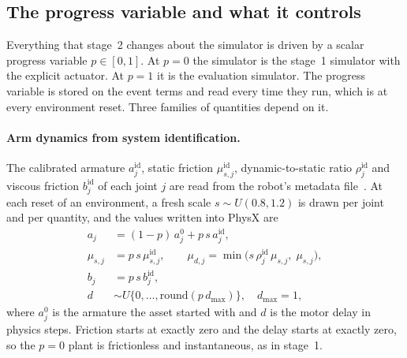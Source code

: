 \subsection{The progress variable and what it controls}

Everything that stage~2 changes about the simulator is driven by a scalar progress variable $p\in[0,1]$. At $p=0$ the simulator is the stage~1 simulator with the explicit actuator. At $p=1$ it is the evaluation simulator. The progress variable is stored on the event terms and read every time they run, which is at every environment reset. Three families of quantities depend on it.

\paragraph{Arm dynamics from system identification.} The calibrated armature $a^{\mathrm{id}}_j$, static friction $\mu^{\mathrm{id}}_{s,j}$, dynamic-to-static ratio $\rho^{\mathrm{id}}_j$ and viscous friction $b^{\mathrm{id}}_j$ of each joint $j$ are read from the robot's metadata file~\cite{bjelonic2025pace}. At each reset of an environment, a fresh scale $s\sim U(0.8,1.2)$ is drawn per joint and per quantity, and the values written into PhysX are
\begin{equation}
\begin{aligned}
  a_j &= (1-p)\,a^{0}_j + p\,s\,a^{\mathrm{id}}_j,\\
  \mu_{s,j} &= p\,s\,\mu^{\mathrm{id}}_{s,j}, \qquad
  \mu_{d,j} = \min\!\big(s\,\rho^{\mathrm{id}}_j\,\mu_{s,j},\;\mu_{s,j}\big),\\
  b_j &= p\,s\,b^{\mathrm{id}}_j,\\
  d &\sim U\{0,\dots,\mathrm{round}(p\,d_{\max})\}, \quad d_{\max}=1,
\end{aligned}
\end{equation}
where $a^{0}_j$ is the armature the asset started with and $d$ is the motor delay in physics steps. Friction starts at exactly zero and the delay starts at exactly zero, so the $p=0$ plant is frictionless and instantaneous, as in stage~1.

